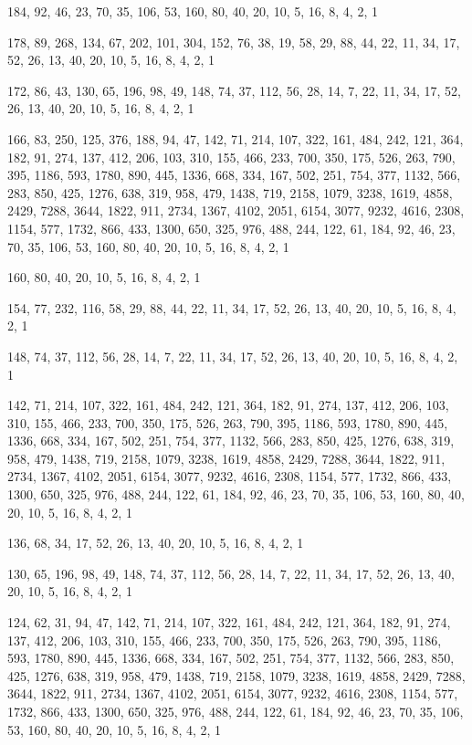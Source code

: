 \documentclass[12pt]{article}
\begin{document}
184, 92, 46, 23, 70, 35, 106, 53, 160, 80, 40, 20, 10, 5, 16, 8, 4, 2, 1

178, 89, 268, 134, 67, 202, 101, 304, 152, 76, 38, 19, 58, 29, 88, 44, 22, 11, 34, 17, 52, 26, 13, 40, 20, 10, 5, 16, 8, 4, 2, 1

172, 86, 43, 130, 65, 196, 98, 49, 148, 74, 37, 112, 56, 28, 14, 7, 22, 11, 34, 17, 52, 26, 13, 40, 20, 10, 5, 16, 8, 4, 2, 1

166, 83, 250, 125, 376, 188, 94, 47, 142, 71, 214, 107, 322, 161, 484, 242, 121, 364, 182, 91, 274, 137, 412, 206, 103, 310, 155, 466, 233, 700, 350, 175, 526, 263, 790, 395, 1186, 593, 1780, 890, 445, 1336, 668, 334, 167, 502, 251, 754, 377, 1132, 566, 283, 850, 425, 1276, 638, 319, 958, 479, 1438, 719, 2158, 1079, 3238, 1619, 4858, 2429, 7288, 3644, 1822, 911, 2734, 1367, 4102, 2051, 6154, 3077, 9232, 4616, 2308, 1154, 577, 1732, 866, 433, 1300, 650, 325, 976, 488, 244, 122, 61, 184, 92, 46, 23, 70, 35, 106, 53, 160, 80, 40, 20, 10, 5, 16, 8, 4, 2, 1

160, 80, 40, 20, 10, 5, 16, 8, 4, 2, 1

154, 77, 232, 116, 58, 29, 88, 44, 22, 11, 34, 17, 52, 26, 13, 40, 20, 10, 5, 16, 8, 4, 2, 1

148, 74, 37, 112, 56, 28, 14, 7, 22, 11, 34, 17, 52, 26, 13, 40, 20, 10, 5, 16, 8, 4, 2, 1

142, 71, 214, 107, 322, 161, 484, 242, 121, 364, 182, 91, 274, 137, 412, 206, 103, 310, 155, 466, 233, 700, 350, 175, 526, 263, 790, 395, 1186, 593, 1780, 890, 445, 1336, 668, 334, 167, 502, 251, 754, 377, 1132, 566, 283, 850, 425, 1276, 638, 319, 958, 479, 1438, 719, 2158, 1079, 3238, 1619, 4858, 2429, 7288, 3644, 1822, 911, 2734, 1367, 4102, 2051, 6154, 3077, 9232, 4616, 2308, 1154, 577, 1732, 866, 433, 1300, 650, 325, 976, 488, 244, 122, 61, 184, 92, 46, 23, 70, 35, 106, 53, 160, 80, 40, 20, 10, 5, 16, 8, 4, 2, 1

136, 68, 34, 17, 52, 26, 13, 40, 20, 10, 5, 16, 8, 4, 2, 1

130, 65, 196, 98, 49, 148, 74, 37, 112, 56, 28, 14, 7, 22, 11, 34, 17, 52, 26, 13, 40, 20, 10, 5, 16, 8, 4, 2, 1

124, 62, 31, 94, 47, 142, 71, 214, 107, 322, 161, 484, 242, 121, 364, 182, 91, 274, 137, 412, 206, 103, 310, 155, 466, 233, 700, 350, 175, 526, 263, 790, 395, 1186, 593, 1780, 890, 445, 1336, 668, 334, 167, 502, 251, 754, 377, 1132, 566, 283, 850, 425, 1276, 638, 319, 958, 479, 1438, 719, 2158, 1079, 3238, 1619, 4858, 2429, 7288, 3644, 1822, 911, 2734, 1367, 4102, 2051, 6154, 3077, 9232, 4616, 2308, 1154, 577, 1732, 866, 433, 1300, 650, 325, 976, 488, 244, 122, 61, 184, 92, 46, 23, 70, 35, 106, 53, 160, 80, 40, 20, 10, 5, 16, 8, 4, 2, 1
\end{document}
